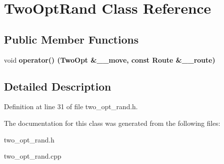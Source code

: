 \section{Two\-Opt\-Rand Class Reference}
\label{class_two_opt_rand}
\subsection*{Public Member Functions}
\begin{CompactItemize}
\item 
void \bf{operator()} (\bf{Two\-Opt} \&\_\-\_\-move, const Route \&\_\-\_\-route)\label{class_two_opt_rand_e2f362f359517c027f6f22fba0aab375}

\end{CompactItemize}


\subsection{Detailed Description}




Definition at line 31 of file two\_\-opt\_\-rand.h.

The documentation for this class was generated from the following files:\begin{CompactItemize}
\item 
two\_\-opt\_\-rand.h\item 
two\_\-opt\_\-rand.cpp\end{CompactItemize}
